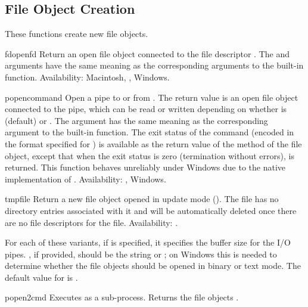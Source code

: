 \subsection{File Object Creation \label{os-newstreams}}

These functions create new file objects.


\begin{funcdesc}{fdopen}{fd}
Return an open file object connected to the file descriptor .
The  and  arguments have the same meaning as
the corresponding arguments to the built-in 
function.
Availability: Macintosh, \UNIX{}, Windows.
\end{funcdesc}

\begin{funcdesc}{popen}{command}
Open a pipe to or from .  The return value is an open
file object connected to the pipe, which can be read or written
depending on whether  is  (default) or .
The  argument has the same meaning as the corresponding
argument to the built-in  function.  The exit status of
the command (encoded in the format specified for ) is
available as the return value of the  method of the file
object, except that when the exit status is zero (termination without
errors),  is returned.   This function
behaves unreliably under Windows due to the native implementation of
.
Availability: \UNIX{}, Windows.
\end{funcdesc}

\begin{funcdesc}{tmpfile}{}
Return a new file object opened in update mode ().  The file
has no directory entries associated with it and will be automatically
deleted once there are no file descriptors for the file.
Availability: \UNIX{}.
\end{funcdesc}


For each of these  variants, if  is
specified, it specifies the buffer size for the I/O pipes.
, if provided, should be the string  or
; on Windows this is needed to determine whether the file
objects should be opened in binary or text mode.  The default value
for  is .

\begin{funcdesc}{popen2}{cmd}
Executes  as a sub-process.  Returns the file objects
.
\end{funcdesc}

